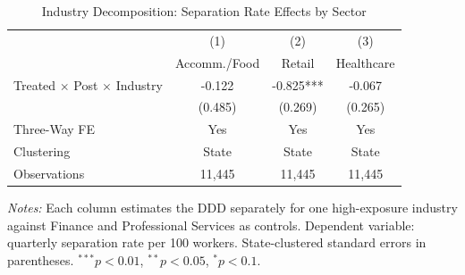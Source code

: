 \begin{table}[htbp]
\centering
\caption{Industry Decomposition: Separation Rate Effects by Sector}
\label{tab:industry}
\begin{tabular}{lccc}
\hline\hline
 & (1) & (2) & (3) \\
 & Accomm./Food & Retail & Healthcare \\
\hline
Treated $\times$ Post $\times$ Industry & -0.122 & -0.825*** & -0.067 \\
 & (0.485) & (0.269) & (0.265) \\[6pt]
Three-Way FE & Yes & Yes & Yes \\
Clustering & State & State & State \\
Observations & 11,445 & 11,445 & 11,445 \\
\hline\hline
\end{tabular}
\begin{tablenotes}[flushleft]
\small
\item \textit{Notes:} Each column estimates the DDD separately for one high-exposure industry against Finance and Professional Services as controls. Dependent variable: quarterly separation rate per 100 workers. State-clustered standard errors in parentheses. $^{***}p<0.01$, $^{**}p<0.05$, $^{*}p<0.1$.
\end{tablenotes}
\end{table}
